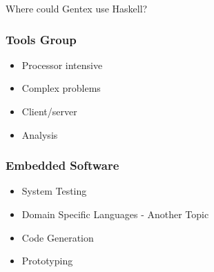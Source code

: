 \begin{frame}
  \Large
  Where could Gentex use Haskell?
\end{frame}

\begin{frame}
  \frametitle{Tools Group}
  \pause
  \begin{itemize}[<+->]
    \item Processor intensive
    \item Complex problems
    \item Client/server
    \item Analysis
  \end{itemize}
\end{frame}

\begin{frame}
  \frametitle{Embedded Software}
  \pause
  \begin{itemize}[<+->]
    \item System Testing
    \item Domain Specific Languages - Another Topic
    \item Code Generation
    \item Prototyping
  \end{itemize}
\end{frame}
